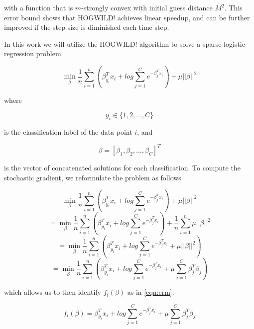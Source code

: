 \documentclass{article}
\begin{document}
with a function that is $m$-strongly convex with initial guess distance $M^2$. This error bound shows that HOGWILD! achieves linear speedup, and can be further improved if the step size is diminished each time step. 

In this work we will utilize the HOGWILD! algorithm to solve a sparse logistic regression problem

\begin{equation}\label{eqn:logreg}
	\min_{\beta} \frac{1}{n} \sum_{i=1}^n(\beta_{y_i}^{T}x_i + log \sum_{j=1}^C e^{-\beta_j^T x_i}) + \mu ||\beta||^2
\end{equation}

where 

\begin{equation}\label{eqn:y_i}
	y_i \in \{1,2,...,C\}
\end{equation}

is the classification label of the data point $i$, and 

\begin{equation}\label{eqn:y_i}
	\beta = [\beta_1, \beta_2, ..., \beta_C]^T
\end{equation}

is the vector of concatenated solutions for each classification. To compute the stochastic gradient, we reformulate the problem as follows

\begin{equation}\label{eqn:logreg1}
	\min_{\beta} \frac{1}{n} \sum_{i=1}^n(\beta_{y_i}^{T}x_i + log \sum_{j=1}^C e^{-\beta_j^T x_i}) + \mu ||\beta||^2
\end{equation}
\begin{equation}\label{eqn:logreg2}
	= \min_{\beta} \frac{1}{n} \sum_{i=1}^n(\beta_{y_i}^{T}x_i + log \sum_{j=1}^C e^{-\beta_j^T x_i}) + \frac{1}{n}\sum_{i=1}^n \mu ||\beta||^2
\end{equation}
\begin{equation}\label{eqn:logreg3}
	= \min_{\beta} \frac{1}{n} \sum_{i=1}^n(\beta_{y_i}^{T}x_i + log \sum_{j=1}^C e^{-\beta_j^T x_i} + \mu ||\beta||^2)
\end{equation}
\begin{equation}\label{eqn:logreg4}
	= \min_{\beta} \frac{1}{n} \sum_{i=1}^n(\beta_{y_i}^{T}x_i + log \sum_{j=1}^C e^{-\beta_j^T x_i} + \mu \sum_{j=1}^C \beta_j^T\beta_j)
\end{equation}

which allows us to then identify $f_i(\beta)$ as in \ref{eqn:erm}. 

\begin{equation}\label{eqn:f_i}
	f_i(\beta) = \beta_{y_i}^{T}x_i + log \sum_{j=1}^C e^{-\beta_j^T x_i} + \mu \sum_{j=1}^C \beta_j^T\beta_j
\end{equation}
\end{document}
